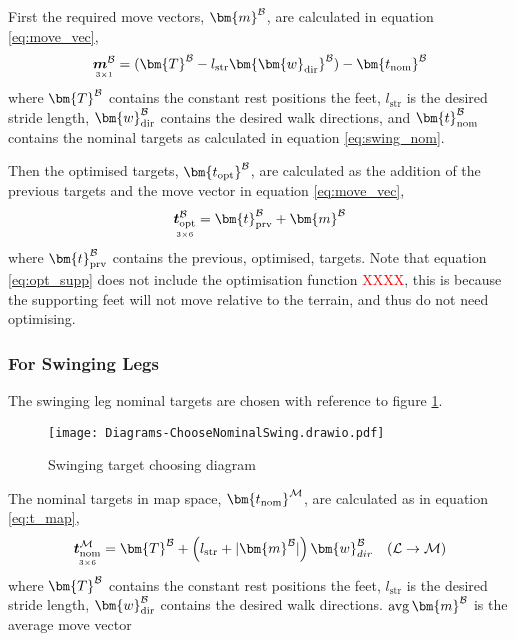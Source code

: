         \noindent
        First the required move vectors, \(\bm{m} ^\fbody\), are calculated in equation \ref{eq:move_vec},
        \begin{equation}\label{eq:move_vec}
            \mdim{\boldsymbol{m}^\fbody}{3}{1} =  (\bm{T}^\fbody - l_\text{str} \bm{\bm{w}_\text{dir}}^\fbody) - \bm{t_\text{nom}}^\fbody
        \end{equation}
        where \(\bm{T}^\fbody\) contains the constant rest positions the feet, \(l_\text{str}\) is the desired stride length, \(\bm{w}_\text{dir}^\fbody\)
        contains the desired walk directions, and \(\bm{t}_\text{nom} ^\fbody\) contains the nominal targets as calculated in
        equation \ref{eq:swing_nom}.

        Then the optimised targets, \(\bm{t_\text{opt}} ^\fbody\), are calculated as the addition of the previous targets and the move vector in equation \ref{eq:move_vec},
        \begin{equation} \label{eq:opt_supp}
            \mdim{\boldsymbol{t}_\text{opt}^\fbody}{3}{6} = \bm{t}_\text{prv}^\fbody + \bm{m}^\fbody
        \end{equation}
        where \(\bm{t}_\text{prv}^\fbody\) contains the previous, optimised, targets. Note that equation \ref{eq:opt_supp} does not include the optimisation
        function \textcolor{red}{XXXX}, this is because the supporting feet will not move relative to the terrain, and thus do not need optimising.

    \newpage
    \subsubsection{For Swinging Legs} \label{sec:swing}
        The swinging leg nominal targets are chosen with reference to figure \ref{fig:swinging_targ}.
        \begin{figure}[h]
            \centering
            \texttt{[image: Diagrams-ChooseNominalSwing.drawio.pdf]}
            \caption{Swinging target choosing diagram} 
            \label{fig:swinging_targ}
        \end{figure}

        \noindent
        The nominal targets in map space, \(\bm{t_\text{nom}} ^{\fmap}\), are calculated as in equation \ref{eq:t_map},
        \begin{equation} \label{eq:t_map}
            \mdim{\boldsymbol{t}_\text{nom}^{\fmap}}{3}{6} = \bm{T}^\fbody + \left(l_\text{str}+|\bm{m}^\fbody|\right)\bm{w}_{dir}^\fbody \transframe{L}{M}
        \end{equation}
        where \(\bm{T}^\fbody\) contains the constant rest positions the feet, \(l_\text{str}\) is the desired stride length, \(\bm{w}_\text{dir}^\fbody\)
        contains the desired walk directions. \(\avg\bm{m}^\fbody\) is the average move vector 

